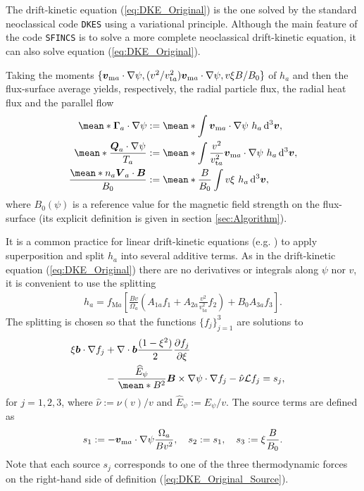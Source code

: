 \documentclass[10pt]{iopart}
\newcommand{\Lorentz}{\mathcal{L}}
\newcommand{\DKES}{{\texttt{DKES}}}
\begin{document}
The drift-kinetic equation (\ref{eq:DKE_Original}) is the one solved by the standard neoclassical code {\DKES} \cite{DKES1986, VanRij_1989} using a variational principle. 
Although the main feature of the code \texttt{SFINCS} \cite{Landreman_2014} is to solve a more complete neoclassical drift-kinetic equation, it can also solve equation (\ref{eq:DKE_Original}).

Taking the moments $\{\vb*{v}_{\text{m} a} \cdot \nabla\psi,  (v^2/v_{\text{t}a}^2)\vb*{v}_{\text{m} a} \cdot \nabla\psi, v\xi B/B_0\}$ of $h_a$ and then the flux-surface average yields, respectively, the radial particle flux, the radial heat flux and the parallel flow
%
\begin{align}
	\mean*{\vb*{\Gamma}_a \cdot \nabla \psi} & := 
	\mean*{
		\int
		\vb*{v}_{\text{m} a} \cdot \nabla\psi	
		\ h_a
		\dd[3]{\vb*{v}}
	},
	\label{eq:Particle_flux_Original}
	\\
	\mean*{\frac{\vb*{Q}_a \cdot \nabla \psi}{T_a}} & := 
	\mean*{
		\int
		\frac{v^2}{v_{\text{t}a}^2}\vb*{v}_{\text{m} a} \cdot \nabla\psi	
		\ h_a
		\dd[3]{\vb*{v}}
	},
	\label{eq:Heat_flux_Original}
	\\
	\frac{\mean*{n_a \vb*{V}_{a} \cdot\vb*{B}}}{B_{0}} & :=
	\mean*{
		\frac{B}{B_0}
		\int
		v \xi 
		\ h_a
		\dd[3]{\vb*{v}}
	},
	\label{eq:Parallel_flow_Original}
\end{align}
where $B_0(\psi)$ is a reference value for the magnetic field strength on the flux-surface (its explicit definition is given in section \ref{sec:Algorithm}).

It is a common practice for linear drift-kinetic equations (e.g. \cite{DKES1986, Beidler_2011,Landreman_2014}) to apply superposition and split $h_a$ into several additive terms. As in the drift-kinetic equation (\ref{eq:DKE_Original}) there are no derivatives or integrals along $\psi$ nor $v$, it is convenient to use the splitting
%
\begin{align}
	h_a 
	= 
	f_{\text{M}a}
	\left[
	\frac{B v}{\Omega_a} 
	\left(
	A_{1a} f_1 
	+ 
	A_{2a}  
	\frac{v^2}{v_{\text{t}a}^2}f_2
	\right)
	+
	B_0 A_{3a} f_3
	\right].
	\label{eq:Distribution_function_superposition}
\end{align}
The splitting is chosen so that the functions $\{f_j\}_{j=1}^{3}$ are solutions to
%
\begin{align}
	\xi \vb*{b}  \cdot 
	\nabla f_j
	& +
	\nabla \cdot \vb*{b} \frac{(1-\xi^2)}{2}  \pdv{f_j}{\xi}  
	\nonumber\\
	&
	- 
	\frac{\widehat{E}_\psi}{\mean*{B^2}}
	\vb*{B}\times \nabla\psi\cdot \nabla f_j
	\label{eq:DKE}
	- \hat{\nu}\Lorentz f_j
	=  s_j, \quad 
\end{align}
for $j=1,2,3$, where $\hat{\nu} := \nu(v) / v$ and $\widehat{E}_\psi := {E}_\psi/v$. The source terms are defined as
%
\begin{align}
	s_1 := - \vb*{v}_{\text{m} a} \cdot \nabla\psi \frac{\Omega_a}{B v^2},
	\quad
	s_2 :=  s_1, 
	\quad
	s_3 := \xi \frac{B}{B_0}.
	\label{eq:DKE_Sources}
\end{align} 
Note that each source $s_j$ corresponds to one of the three thermodynamic forces on the right-hand side of definition (\ref{eq:DKE_Original_Source}).
\end{document}
